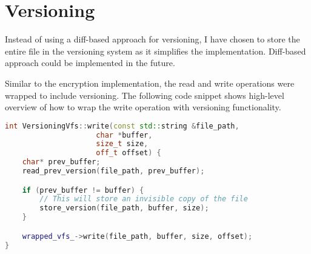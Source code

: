 

\section{Versioning}\label{sec:versioning2}

Instead of using a diff-based approach for versioning, I have chosen to store the entire file in the versioning system as it simplifies the implementation.
Diff-based approach could be implemented in the future.

Similar to the encryption implementation, the read and write operations were wrapped to include versioning.
The following code snippet shows high-level overview of how to wrap the write operation with versioning functionality.

\begin{lstlisting}[language=c++, basicstyle=\ttfamily\small]
int VersioningVfs::write(const std::string &file_path,
                     char *buffer,
                     size_t size,
                     off_t offset) {
    char* prev_buffer;
    read_prev_version(file_path, prev_buffer);

    if (prev_buffer != buffer) {
        // This will store an invisible copy of the file
        store_version(file_path, buffer, size);
    }

    wrapped_vfs_->write(file_path, buffer, size, offset);
}
\end{lstlisting}